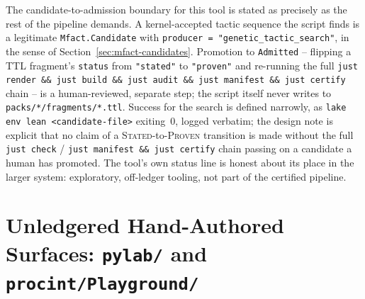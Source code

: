 The candidate-to-admission boundary for this tool is stated as
precisely as the rest of the pipeline demands. A kernel-accepted tactic
sequence the script finds is a legitimate \texttt{Mfact.Candidate} with
\texttt{producer = "genetic\_tactic\_search"}, in the sense of
Section~\ref{sec:mfact-candidates}. Promotion to \texttt{Admitted} --
flipping a TTL fragment's \texttt{status} from \texttt{"stated"} to
\texttt{"proven"} and re-running the full \texttt{just render \&\& just
build \&\& just audit \&\& just manifest \&\& just certify} chain -- is a
human-reviewed, separate step; the script itself never writes to
\texttt{packs/*/fragments/*.ttl}. Success for the search is defined
narrowly, as \texttt{lake env lean <candidate-file>} exiting~0, logged
verbatim; the design note is explicit that no claim of a
\textsc{Stated}-to-\textsc{Proven} transition is made without the full
\texttt{just check} / \texttt{just manifest \&\& just certify} chain
passing on a candidate a human has promoted. The tool's own status
line is honest about its place in the larger system: exploratory,
off-ledger tooling, not part of the certified pipeline.

\section{Unledgered Hand-Authored Surfaces: \texttt{pylab/} and \texttt{procint/Playground/}}
\label{sec:ai-unledgered}


